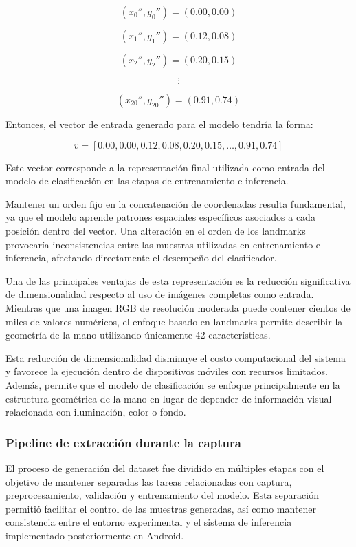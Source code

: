 	\[
	(x_0'',y_0'')=(0.00,0.00)
	\]
	
	\[
	(x_1'',y_1'')=(0.12,0.08)
	\]
	
	\[
	(x_2'',y_2'')=(0.20,0.15)
	\]
	
	\[
	\vdots
	\]
	
	\[
	(x_{20}'',y_{20}'')=(0.91,0.74)
	\]
	
	Entonces, el vector de entrada generado para el modelo tendría la forma:
	
	\[
	v =
	[
	0.00,0.00,
	0.12,0.08,
	0.20,0.15,
	\ldots,
	0.91,0.74
	]
	\]
	
	Este vector corresponde a la representación final utilizada como entrada del
	modelo de clasificación en las etapas de entrenamiento e inferencia.
	
	Mantener un orden fijo en la concatenación de coordenadas resulta
	fundamental, ya que el modelo aprende patrones espaciales específicos asociados
	a cada posición dentro del vector. Una alteración en el orden de los landmarks
	provocaría inconsistencias entre las muestras utilizadas en entrenamiento e
	inferencia, afectando directamente el desempeño del clasificador.
	
	Una de las principales ventajas de esta representación es la reducción
	significativa de dimensionalidad respecto al uso de imágenes completas como
	entrada. Mientras que una imagen RGB de resolución moderada puede contener
	cientos de miles de valores numéricos, el enfoque basado en landmarks permite
	describir la geometría de la mano utilizando únicamente 42 características.
	
	Esta reducción de dimensionalidad disminuye el costo computacional del sistema y
	favorece la ejecución dentro de dispositivos móviles con recursos
	limitados. Además, permite que el modelo de clasificación se enfoque
	principalmente en la estructura geométrica de la mano en lugar de depender de
	información visual relacionada con iluminación, color o fondo.
	
	\subsubsection{Pipeline de extracción durante la captura}
	
	El proceso de generación del dataset fue dividido en múltiples etapas con el
	objetivo de mantener separadas las tareas relacionadas con captura,
	preprocesamiento, validación y entrenamiento del modelo. Esta separación permitió
	facilitar el control de las muestras generadas, así como mantener consistencia
	entre el entorno experimental y el sistema de inferencia implementado
	posteriormente en Android.
	
